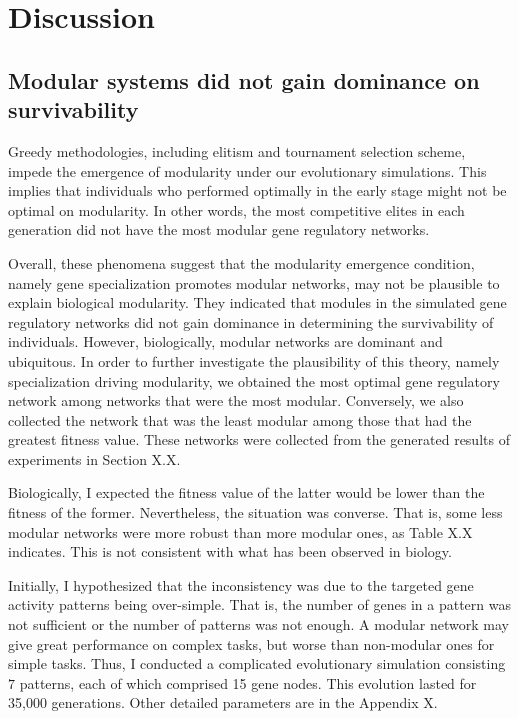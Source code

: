 \section{Discussion}
\subsection{Modular systems did not gain dominance on survivability}
Greedy methodologies, including elitism and tournament selection scheme, impede the emergence of modularity under our evolutionary simulations. This implies that individuals who performed optimally in the early stage might not be optimal on modularity. In other words, the most competitive elites in each generation did not have the most modular gene regulatory networks. 

Overall, these phenomena suggest that the modularity emergence condition, namely gene specialization promotes modular networks, may not be plausible to explain biological modularity. They indicated that modules in the simulated gene regulatory networks did not gain dominance in determining the survivability of individuals. However, biologically, modular networks are dominant and ubiquitous. In order to further investigate the plausibility of this theory, namely specialization driving modularity, we obtained the most optimal gene regulatory network among networks that were the most modular. Conversely, we also collected the network that was the least modular among those that had the greatest fitness value. These networks were collected from the generated results of experiments in Section X.X.

Biologically, I expected the fitness value of the latter would be lower than the fitness of the former. Nevertheless, the situation was converse. That is, some less modular networks were more robust than more modular ones, as Table X.X indicates. This is not consistent with what has been observed in biology.

Initially, I hypothesized that the inconsistency was due to the targeted gene activity patterns being over-simple. That is, the number of genes in a pattern was not sufficient or the number of patterns was not enough. A modular network may give great performance on complex tasks, but worse than non-modular ones for simple tasks. Thus, I conducted a complicated evolutionary simulation consisting $7$ patterns, each of which comprised 15 gene nodes. This evolution lasted for 35,000 generations. Other detailed parameters are in the Appendix X.

